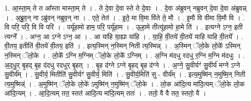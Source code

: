 \documentclass[17pt]{extarticle}
\begin{document}
1. आ॒स्ता॒म् ते त आ᳚स्ता मास्ता॒म् ते । . ते दे॒वा दे॒वा स्ते ते दे॒वाः । . दे॒वा अ॑ब्रुवन् नब्रुवन् दे॒वा दे॒वा अ॑ब्रुवन्न् । . अ॒ब्रु॒व॒न् ना ऽब्रु॑वन् नब्रुव॒न् ना । . एते॒ तेत॑ । . इ॒ते॒ मा वि॒मा वि॑ते ते॒ मौ । . इ॒मौ वि वीमा वि॒मौ वि । . वि परि॒ परि॒ वि वि परि॑ । . पर्यू॑हामो हाम॒ परि॒ पर्यू॑हाम । . ऊ॒हा॒मे तीत्यू॑हामो हा॒मे ति॑ । . इत्यग्ने ऽग्न॒ इती त्यग्ने᳚ । . अग्न॒ आ ऽग्ने ऽग्न॒ आ । . आ या॑हि या॒ह्या या॑हि । . या॒हि॒ वी॒तये॑ वी॒तये॑ याहि याहि वी॒तये᳚ । . वी॒तय॒ इतीति॑ वी॒तये॑ वी॒तय॒ इति॑ । . इत्य॒स्मिन् न॒स्मिन् निती त्य॒स्मिन्न् । . अ॒स्मिन् ॅलो॒के लो॒के᳚ ऽस्मिन् न॒स्मिन् ॅलो॒के । . लो॒के᳚ ऽग्नि म॒ग्निम् ॅलो॒के लो॒के᳚ ऽग्निम् । . अ॒ग्नि म॑दधु रदधु र॒ग्नि म॒ग्नि म॑दधुः । . अ॒द॒धु॒र् बृ॒हद् बृ॒ह द॑दधु रदधुर् बृ॒हत् । . बृ॒ह द॑ग्ने ऽग्ने बृ॒हद् बृ॒ह द॑ग्ने । . अ॒ग्ने॒ सु॒वीर्यꣳ॑ सु॒वीर्य॑ मग्ने ऽग्ने सु॒वीर्य᳚म् । . सु॒वीर्य॒ मितीति॑ सु॒वीर्यꣳ॑ सु॒वीर्य॒ मिति॑ । . सु॒वीर्य॒मिति॑ सु - वीर्य᳚म् । . इत्य॒मुष्मि॑न् न॒मुष्मि॒न् निती त्य॒मुष्मिन्न्॑ । . अ॒मुष्मि॑न् ॅलो॒के लो॒के॑ ऽमुष्मि॑न् न॒मुष्मि॑न् ॅलो॒के । . लो॒क आ॑दि॒त्य मा॑दि॒त्यम् ॅलो॒के लो॒क आ॑दि॒त्यम् । . आ॒दि॒त्यम् तत॒ स्तत॑ आदि॒त्य मा॑दि॒त्यम् ततः॑ । . ततो॒ वै वै तत॒ स्ततो॒ वै । \newline
\end{document}

